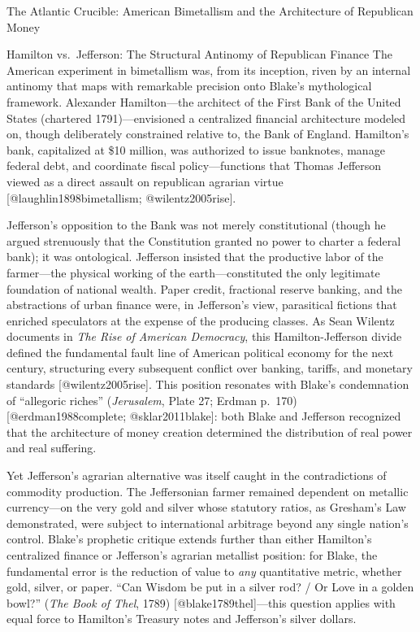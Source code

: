 \documentclass[
  ignorenonframetext,
]{beamer}
\begin{document}
\begin{frame}{The Atlantic Crucible: American Bimetallism and the
Architecture of Republican Money}
\begin{block}{Hamilton vs.~Jefferson: The Structural Antinomy of
Republican Finance}
\protect{}\label{hamilton-vs.-jefferson-the-structural-antinomy-of-republican-finance}
The American experiment in bimetallism was, from its inception, riven by
an internal antinomy that maps with remarkable precision onto Blake's
mythological framework. Alexander Hamilton---the architect of the First
Bank of the United States (chartered 1791)---envisioned a centralized
financial architecture modeled on, though deliberately constrained
relative to, the Bank of England. Hamilton's bank, capitalized at \$10
million, was authorized to issue banknotes, manage federal debt, and
coordinate fiscal policy---functions that Thomas Jefferson viewed as a
direct assault on republican agrarian virtue
{[}@laughlin1898bimetallism; @wilentz2005rise{]}.

Jefferson's opposition to the Bank was not merely constitutional (though
he argued strenuously that the Constitution granted no power to charter
a federal bank); it was ontological. Jefferson insisted that the
productive labor of the farmer---the physical working of the
earth---constituted the only legitimate foundation of national wealth.
Paper credit, fractional reserve banking, and the abstractions of urban
finance were, in Jefferson's view, parasitical fictions that enriched
speculators at the expense of the producing classes. As Sean Wilentz
documents in \emph{The Rise of American Democracy}, this
Hamilton-Jefferson divide defined the fundamental fault line of American
political economy for the next century, structuring every subsequent
conflict over banking, tariffs, and monetary standards
{[}@wilentz2005rise{]}. This position resonates with Blake's
condemnation of ``allegoric riches'' (\emph{Jerusalem}, Plate 27; Erdman
p.~170) {[}@erdman1988complete; @sklar2011blake{]}: both Blake and
Jefferson recognized that the architecture of money creation determined
the distribution of real power and real suffering.

Yet Jefferson's agrarian alternative was itself caught in the
contradictions of commodity production. The Jeffersonian farmer remained
dependent on metallic currency---on the very gold and silver whose
statutory ratios, as Gresham's Law demonstrated, were subject to
international arbitrage beyond any single nation's control. Blake's
prophetic critique extends further than either Hamilton's centralized
finance or Jefferson's agrarian metallist position: for Blake, the
fundamental error is the reduction of value to \emph{any} quantitative
metric, whether gold, silver, or paper. ``Can Wisdom be put in a silver
rod? / Or Love in a golden bowl?'' (\emph{The Book of Thel}, 1789)
{[}@blake1789thel{]}---this question applies with equal force to
Hamilton's Treasury notes and Jefferson's silver dollars.
\end{block}
\end{frame}
\end{document}
